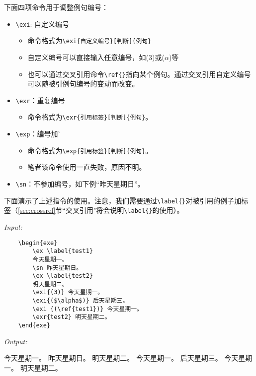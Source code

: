 \documentclass[a4paper,12pt]{article}
\begin{document}
下面四项命令用于调整例句编号：

\begin{itemize}
	\item \verb|\exi|: 自定义编号
		\begin{itemize}
			\item 命令格式为\verb|\exi{自定义编号}[判断]{例句}|
			\item 自定义编号可以直接输入任意编号，如(3)或($\alpha$)等
			\item 也可以通过交叉引用命令\verb|\ref{}|指向某个例句。通过交叉引用自定义编号可以随被引例句编号的变动而改变。
		\end{itemize}
	\item \verb|\exr|：重复编号
		\begin{itemize}
			\item 命令格式为\verb|\exr{引用标签}[判断]{例句}|。
		\end{itemize}
	\item \verb|\exp|：编号加'
		\begin{itemize}
			\item 命令格式为\verb|\exp{引用标签}[判断]{例句}|。
			\item 笔者该命令使用一直失败，原因不明。
		\end{itemize}
	\item \verb|\sn|：不参加编号，如下例``昨天星期日''。
\end{itemize}

下面演示了上述指令的使用。注意，我们需要通过\verb|\label{}|对被引用的例子加标签（\ref{sec:crossref}节``交叉引用"将会说明\verb|\label{}|的使用）。

\vspace{3mm}
\textit{Input:}
\begin{Verbatim}
	\begin{exe}
		\ex \label{test1}
		今天星期一。
		\sn 昨天星期日。
		\ex \label{test2}
		明天星期二。	
		\exi{(3)} 今天星期一。
		\exi{($\alpha$)} 后天星期三。
		\exi {(\ref{test1})} 今天星期一。
		\exr{test2} 明天星期二。
	\end{exe}
\end{Verbatim}

\vspace{3mm}
\textit{Output:}
\begin{exe}
	\ex \label{test1}
	今天星期一。
	\sn 昨天星期日。
	\ex \label{test2}
	明天星期二。	
	 今天星期一。
	\exi{($\alpha$)} 后天星期三。
	\exi {(\ref{test1})} 今天星期一。
	 明天星期二。
\end{exe}
\end{document}
